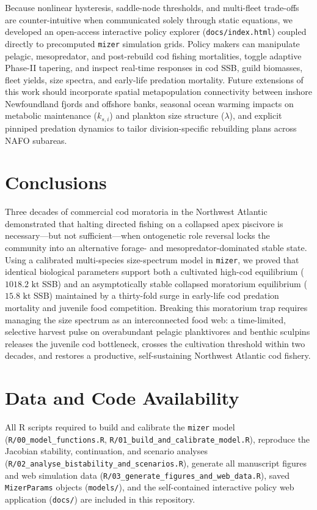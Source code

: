 \documentclass[11pt,letterpaper]{article}
\begin{document}
Because nonlinear hysteresis, saddle-node thresholds, and multi-fleet trade-offs are counter-intuitive when communicated solely through static equations, we developed an open-access interactive policy explorer (\texttt{docs/index.html}) coupled directly to precomputed \texttt{mizer} simulation grids. Policy makers can manipulate pelagic, mesopredator, and post-rebuild cod fishing mortalities, toggle adaptive Phase-II tapering, and inspect real-time responses in cod SSB, guild biomasses, fleet yields, size spectra, and early-life predation mortality. Future extensions of this work should incorporate spatial metapopulation connectivity between inshore Newfoundland fjords and offshore banks, seasonal ocean warming impacts on metabolic maintenance ($k_{s,i}$) and plankton size structure ($\lambda$), and explicit pinniped predation dynamics to tailor division-specific rebuilding plans across NAFO subareas.

\section{Conclusions}

Three decades of commercial cod moratoria in the Northwest Atlantic demonstrated that halting directed fishing on a collapsed apex piscivore is necessary---but not sufficient---when ontogenetic role reversal locks the community into an alternative forage- and mesopredator-dominated stable state. Using a calibrated multi-species size-spectrum model in \texttt{mizer}, we proved that identical biological parameters support both a cultivated high-cod equilibrium ($1018.2\text{ kt}$ SSB) and an asymptotically stable collapsed moratorium equilibrium ($15.8\text{ kt}$ SSB) maintained by a thirty-fold surge in early-life cod predation mortality and juvenile food competition. Breaking this moratorium trap requires managing the size spectrum as an interconnected food web: a time-limited, selective harvest pulse on overabundant pelagic planktivores and benthic sculpins releases the juvenile cod bottleneck, crosses the cultivation threshold within two decades, and restores a productive, self-sustaining Northwest Atlantic cod fishery.

\section*{Data and Code Availability}

All R scripts required to build and calibrate the \texttt{mizer} model (\texttt{R/00\_\allowbreak model\_\allowbreak functions.R}, \texttt{R/01\_\allowbreak build\_\allowbreak and\_\allowbreak calibrate\_\allowbreak model.R}), reproduce the Jacobian stability, continuation, and scenario analyses (\texttt{R/02\_\allowbreak analyse\_\allowbreak bistability\_\allowbreak and\_\allowbreak scenarios.R}), generate all manuscript figures and web simulation data (\texttt{R/03\_\allowbreak generate\_\allowbreak figures\_\allowbreak and\_\allowbreak web\_\allowbreak data.R}), saved \texttt{MizerParams} objects (\texttt{models/}), and the self-contained interactive policy web application (\texttt{docs/}) are included in this repository.



\end{document}
